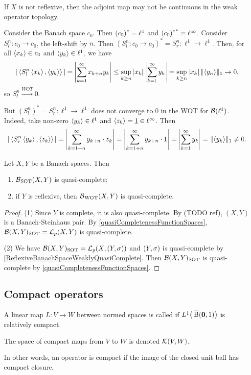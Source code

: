 \begin{example}
If $X$ is not reflexive, then the adjoint map may not be continuous in the weak operator topology.

Consider the Banach space $c_0$. Then ${(c_0)}^* = \ell^1$ and ${{(c_0)}^*}^* = \ell^\infty$. Consider $S_l^n: c_0 \to c_0$, the left-shift by $n$. Then $(S_l^n: c_0 \to c_0)^* = S_r^n: \ell^1 \to \ell^1$. Then, for all $\left\langle x_k \right\rangle \in c_0$ and $\left\langle y_k \right\rangle\in \ell^1$, we have
\[ |\left\langle S_l^n\left\langle x_k \right\rangle, \left\langle y_k \right\rangle \right\rangle| = \left|\sum_{k=1}^\infty x_{k+n}y_k \right| \leq \sup_{k\geq n}|x_k|\left|\sum_{k=1}^\infty y_k \right| = \sup_{k\geq n}|x_k|\,\lVert\left\langle y_n \right\rangle\rVert_1 \to 0, \]
so $S_l^n \overset{WOT}{\longrightarrow} 0$.

But $(S_l^n)^* = S_r^n: \ell^1\to \ell^1$ does not converge to $0$ in the WOT for $\operatorname{\mathcal{B}}(\ell^1)$. Indeed, take non-zero $\left\langle y_k \right\rangle\in \ell^1$ and $\left\langle z_k \right\rangle = \underline{1} \in \ell^\infty$.
Then
\[ |\left\langle S_r^n\left\langle y_k \right\rangle, \left\langle z_k \right\rangle \right\rangle| = \left|\sum_{k=1+n}^\infty y_{k+n}\cdot z_k \right| = \left|\sum_{k=1+n}^\infty y_{k+n}\cdot 1 \right| = \left|\sum_{k=1}^\infty y_{k} \right| = \lVert\left\langle y_k \right\rangle\rVert_1 \neq 0. \]
\end{example}

\begin{proposition}
Let $X, Y$ be a Banach spaces. Then
\begin{enumerate}
\item $\operatorname{\mathcal{B}}_{\text{SOT}}(X,Y)$ is quasi-complete;
\item if $Y$ is reflexive, then $\operatorname{\mathcal{B}}_{\text{WOT}}(X,Y)$ is quasi-complete.
\end{enumerate}
\end{proposition}
\begin{proof}
(1) Since $Y$ is complete, it is also quasi-complete. By (TODO ref), $(X,Y)$ is a Banach-Steinhaus pair. By \ref{quasiCompletenessFunctionSpaces}, $\operatorname{\mathcal{B}}(X,Y)_\text{SOT} = \operatorname{\mathcal{L}}_p(X,Y)$ is quasi-complete.

(2) We have $\Bounded(X,Y)_\text{SOT} = \contLin_p(X,\sSet{Y,\sigma})$ and $\sSet{Y,\sigma}$ is quasi-complete by \ref{ReflexiveBanachSpaceWeaklyQuasiComplete}. Then $\operatorname{\mathcal{B}}(X,Y)_\text{SOT}$ is quasi-complete by \ref{quasiCompletenessFunctionSpaces}.
\end{proof}



\subsection{Compact operators}
\begin{definition}
A linear map $L:V\to W$ between normed spaces is called  if $L^\downarrow\big(\operatorname{\overline{B}}(\boldsymbol{\mathrm{0}}, 1)\big)$ is relatively compact.

The space of compact maps from $V$ to $W$ is denoted $\operatorname{\mathcal{K}}(V,W)$.
\end{definition}
In other words, an operator is compact if the image of the closed unit ball has compact closure.

